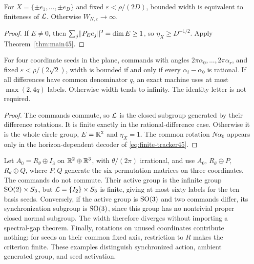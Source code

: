 \begin{corollary}\label{cor:basis45}
For $X=\{\pm e_1,\ldots,\pm e_D\}$ and fixed $\varepsilon<\rho/(2D)$, bounded width is equivalent to finiteness of $\mathcal L$. Otherwise $W_{N,\varepsilon}\to\infty$.
\end{corollary}
\begin{proof}
If $E\ne0$, then $\sum_j\lVert P_Ee_j\rVert^2=\dim E\ge1$, so $\eta_X\ge D^{-1/2}$. Apply Theorem~\ref{thm:main45}.
\end{proof}

\begin{corollary}\label{cor:planar-dichotomy45}
For four coordinate seeds in the plane, commands with angles
$2\pi\alpha_0,\ldots,2\pi\alpha_r$, and fixed
$\varepsilon<\rho/(2\sqrt2)$, width is bounded if and only if every
$\alpha_i-\alpha_0$ is rational. If all differences have common denominator
$q$, an exact machine uses at most $\max(2,4q)$ labels. Otherwise width tends to infinity. The identity letter is not required.
\end{corollary}
\begin{proof}
The commands commute, so $\mathcal L$ is the closed subgroup generated by their difference rotations. It is finite exactly in the rational-difference case. Otherwise it is the whole circle group, $E=\mathbb R^2$ and $\eta_X=1$. The common rotation $N\alpha_0$ appears only in the horizon-dependent decoder of \eqref{eq:finite-tracker45}.
\end{proof}

\begin{remark}\label{rem:examples45}
Let $A_0=R_\theta\oplus I_3$ on $\mathbb R^2\oplus\mathbb R^3$, with $\theta/(2\pi)$ irrational, and use $A_0$, $R_\theta\oplus P$, $R_\theta\oplus Q$, where $P,Q$ generate the six permutation matrices on three coordinates. The commands do not commute. Their active group is the infinite group $\operatorname{SO}(2)\times S_3$, but $\mathcal L=\{I_2\}\times S_3$ is finite, giving at most sixty labels for the ten basis seeds. Conversely, if the active group is $\operatorname{SO}(3)$ and two commands differ, its synchronization subgroup is $\operatorname{SO}(3)$, since this group has no nontrivial proper closed normal subgroup. The width therefore diverges without importing a spectral-gap theorem. Finally, rotations on unused coordinates contribute nothing: for seeds on their common fixed axis, restriction to $R$ makes the criterion finite. These examples distinguish synchronized action, ambient generated group, and seed activation.
\end{remark}
